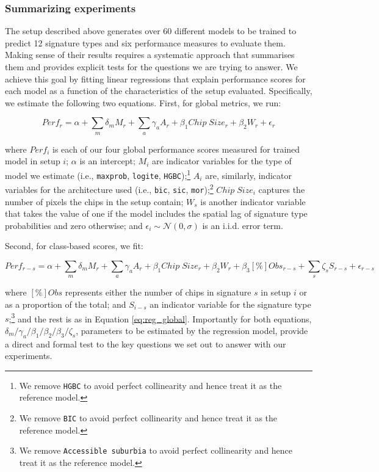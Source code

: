 \subsubsection{Summarizing experiments}


The setup described above generates over 60 different
models to be trained to predict 12 signature types and six performance measures
to evaluate them. Making sense of their results requires a
systematic approach that summarises them and provides explicit tests for the
questions we are trying to answer. We achieve this goal by fitting linear
regressions that explain performance scores for each model as a function
of the characteristics of the setup evaluated. Specifically, we estimate the
following two equations. First, for global metrics, we run:

\begin{equation}
        Perf_r = \alpha +
        \sum_m \delta_m M_r +
        \sum_a \gamma_a A_r +
        \beta_1 Chip \; Size_r +
        \beta_2 W_r +
        \epsilon_r
        \label{eq:reg_global}
\end{equation}


where $Perf_i$ is each of our four global performance scores measured for trained
model in setup $i$; $\alpha$ is an intercept; $M_i$ are indicator variables for the
type of model we estimate (i.e., \texttt{maxprob}, \texttt{logite},
\texttt{HGBC});\footnote{We remove \texttt{HGBC} to avoid perfect
collinearity and hence treat it as the reference model.} $A_i$ are,
similarly, indicator variables for the architecture used (i.e.,
\texttt{bic}, \texttt{sic}, \texttt{mor});\footnote{We remove \texttt{BIC} to avoid perfect
collinearity and hence treat it as the reference model.} $Chip \; Size_i$
captures the number of pixels the chips in the setup contain; $W_s$ is another
indicator variable that takes the value of one if the model includes the
spatial lag of signature type probabilities and zero otherwise;
and $\epsilon_i \sim \mathcal{N}(0, \sigma)$ is an i.i.d. error term.

Second, for class-based scores, we fit:

\begin{equation}
        Perf_{r-s} = \alpha +
        \sum_m \delta_m M_r +
        \sum_a \gamma_a A_r +
        \beta_1 Chip \; Size_r +
        \beta_2 W_r +
        \beta_3 \left[\%\right]Obs_{r-s} +
        \sum_s \zeta_s S_{r-s} +
        \epsilon_{r-s}
        \label{eq:reg_class}
\end{equation}

where $\left[\%\right]Obs$ represents either the number of chips in
signature $s$ in setup $i$ or as a proportion of the total; and $S_{i-s}$ an
indicator variable for the signature type $s$;\footnote{We remove
\texttt{Accessible suburbia} to avoid perfect collinearity and hence treat it
as the reference model.} and the rest is as in Equation \ref{eq:reg_global}.
%
Importantly for both equations,
$\delta_m/\gamma_a/\beta_1/\beta_2/\beta_3/\zeta_s$, parameters to be
estimated by the regression model, provide a direct and formal test to the key
questions we set out to answer with our experiments.
